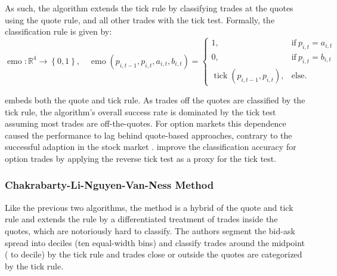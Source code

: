 As such, the  algorithm extends the tick rule by classifying trades at the quotes using the quote rule, and all other trades with the tick test. Formally, the classification rule is given by:
\begin{equation}
  \operatorname{emo} \colon \mathbb{R}^4 \to \left\{0, 1 \right\}, \quad
  \operatorname{emo}(p_{i, t-1}, p_{i, t}, a_{i, t}, b_{i, t})=
  \begin{cases}
    1,                                         & \text{if}\ p_{i, t} = a_{i, t} \\
    0,                                         & \text{if}\ p_{i, t} = b_{i, t} \\
    \operatorname{tick}(p_{i, t-1}, p_{i, t}), & \text{else}.
  \end{cases}
  \label{eq:emo-rule}
\end{equation}

 embeds both the quote and tick rule. As trades off the quotes are classified by the tick rule, the algorithm's overall success rate is dominated by the tick test assuming most trades are off-the-quotes. For option markets \autocites[cp.][891]{savickasInferringDirectionOption2003}[][21]{grauerOptionTradeClassification2022} this dependence caused the performance to lag behind quote-based approaches, contrary to the successful adaption in the stock market \autocites[cp.][541]{ellisAccuracyTradeClassification2000}[][3818]{chakrabartyTradeClassificationAlgorithms2007}. \textcite[][31--35]{grauerOptionTradeClassification2022} improve the classification accuracy for option trades by applying the reverse tick test as a proxy for the tick test.

\subsubsection{Chakrabarty-Li-Nguyen-Van-Ness
  Method}\label{sec:chakarabarty-li-nguyen-van-ness-method}

Like the previous two algorithms, the  method \autocite[][3809]{chakrabartyTradeClassificationAlgorithms2012} is a hybrid of the quote and tick rule and extends the  rule by a differentiated treatment of trades inside the quotes, which are notoriously hard to classify. The authors segment the bid-ask spread into deciles (ten equal-width bins) and classify trades around the midpoint ( to  decile) by the tick rule and trades close or outside the quotes are categorized by the tick rule.

